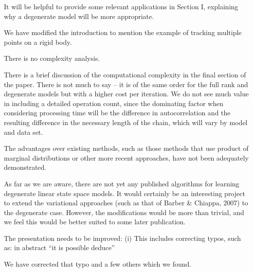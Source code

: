 \documentclass{article}
\newenvironment{review}[0]{\begin{itshape}\color{Gray}\noindent}{\end{itshape}\vspace{0.4cm}}
\newenvironment{response}[0]{\noindent}{\vspace{0.4cm}}
\begin{document}
\begin{review}
It will be helpful to provide some relevant applications in Section I, explaining why a degenerate model will be more appropriate.
\end{review}

\begin{response}
We have modified the introduction to mention the example of tracking multiple points on a rigid body.
\end{response}

\begin{review}
There is no complexity analysis.
\end{review}

\begin{response}
There is a brief discussion of the computational complexity in the final section of the paper. There is not much to say -- it is of the same order for the full rank and degenerate models but with a higher cost per iteration. We do not see much value in including a detailed operation count, since the dominating factor when considering processing time will be the difference in autocorrelation and the resulting difference in the necessary length of the chain, which will vary by model and data set.
\end{response}

\begin{review}
The advantages over existing methods, such as those methods that use product of marginal distributions or other more recent approaches, have not been adequately demonstrated.
\end{review}

\begin{response}
 As far as we are aware, there are not yet any published algorithms for learning degenerate linear state space models. It would certainly be an interesting project to extend the variational approaches (such as that of Barber \& Chiappa, 2007) to the degenerate case. However, the modifications would be more than trivial, and we feel this would be better suited to some later publication.
\end{response}

\begin{review}
The presentation needs to be improved:
(i) This includes correcting typos, such as: in abstract ``it is possible deduce''
\end{review}

\begin{response}
 We have corrected that typo and a few others which we found.
\end{response}
\end{document}
